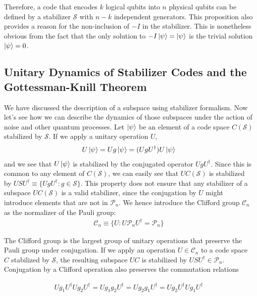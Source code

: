\documentclass[12pt, twoside, openany]{book}
\begin{document}
Therefore, a code that encodes $k$ logical qubits into $n$ physical qubits can be defined by a stabilizer $\mathcal{S}$ with $n-k$ independent generators. This proposition also provides a reason for the non-inclusion of $-I$ in the stabilizer. This is nonetheless obvious from the fact that the only solution to $-I\ket{\psi} = \ket{\psi}$ is the trivial solution $\ket{\psi} = 0$.

\subsection{Unitary Dynamics of Stabilizer Codes and the Gottessman-Knill Theorem}

We have discussed the description of a subspace using stabilizer formalism. Now let's see how we can describe the dynamics of those subspaces under the action of noise and other quantum processes. Let $\ket{\psi}$ be an element of a code space $C(\mathcal{S})$ stabilized by $\mathcal{S}$. If we apply a unitary operation $U$,
\begin{align}
    U \ket{\psi} = U g \ket{\psi} = (U g U^\dagger) U \ket{\psi}
\end{align}
and we see that $U \ket{\psi}$ is stabilized by the conjugated operator $U g U^\dagger$. Since this is common to any element of $C(\mathcal{S})$, we can easily see that $U C(\mathcal{S})$ is stabilized by $USU^\dagger \equiv \{ U g U^\dagger : g \in \mathcal{S} \} $. This property does not ensure that any stabilizer of a subspace $U C(\mathcal{S})$ is a valid stabilizer, since the conjugation by $U$ might introduce elements that are not in $\mathcal{P}_n$. We hence introduce the Clifford group $\mathcal{C}_n$ as the normalizer of the Pauli group:
\begin{align*}
    \mathcal{C}_n \equiv \{ U : U \mathcal{P}_n U^\dagger = \mathcal{P}_n \}
\end{align*}

The Clifford group is the largest group of unitary operations that preserve the Pauli group under conjugation. If we apply an operation $U \in \mathcal{C}_n$ to a code space $C$ stabilized by $\mathcal{S}$, the resulting subspace $UC$ is stabilized by $USU^\dagger \in \mathcal{P}_n$. Conjugation by a Clifford operation also preserves the commutation relations

\begin{align*}
    U g_1 U^\dagger U g_2 U^\dagger = U g_1 g_2 U^\dagger = U g_2 g_1 U^\dagger = U g_2 U^\dagger U g_1 U^\dagger
\end{align*}
\end{document}
